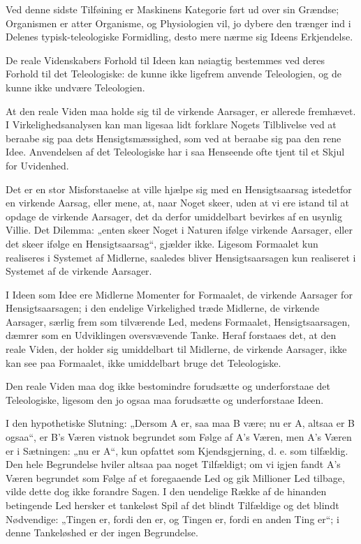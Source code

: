 \documentclass[12pt]{book}
\newcommand{\opage}[1]{\marginnote{\footnotesize\textit{[#1]}}}
\begin{document}
Ved denne sidste Tilføining er Maskinens Kategorie ført ud over sin Grændse; Organismen er atter
Organisme, og Physiologien vil, jo dybere den trænger ind i Delenes typisk-teleologiske Formidling,
desto mere nærme sig Ideens Erkjendelse.

De reale Videnskabers Forhold til Ideen kan nøiagtig bestemmes ved deres Forhold til det Teleologiske:
de kunne ikke ligefrem anvende Teleologien, og de kunne ikke undvære Teleologien.

At den reale Viden maa holde sig til de virkende Aarsager, er allerede fremhævet. I
Virkelighedsanalysen kan man ligesaa lidt forklare Nogets Tilblivelse ved at beraabe sig paa dets
Hensigtsmæssighed, som ved at beraabe sig paa den rene Idee. Anvendelsen af det Teleologiske har i saa
Henseende ofte tjent til et Skjul for Uvidenhed.

Det er en stor Misforstaaelse at ville hjælpe sig med en Hensigtsaarsag istedetfor en virkende Aarsag,
eller mene, at, naar Noget skeer, uden at vi ere istand til at opdage de virkende Aarsager, det da
derfor umiddelbart bevirkes af en usynlig Villie. Det Dilemma: „enten skeer Noget i Naturen ifølge
virkende Aarsager, eller det skeer ifølge en Hensigtsaarsag“, gjælder ikke. Ligesom Formaalet kun
realiseres i Systemet af Midlerne, saaledes bliver Hensigtsaarsagen kun realiseret i Systemet af de
virkende Aarsager.

I Ideen som Idee ere Midlerne Momenter for Formaalet, de virkende Aarsager for Hensigtsaarsagen; i den
endelige Virkelighed træde Midlerne, de virkende Aarsager, særlig frem som tilværende Led, medens
Formaalet, Hensigtsaarsagen, dæmrer som en Udviklingen oversvævende Tanke.
\opage{189} Heraf forstaaes det, at den reale Viden, der holder sig umiddelbart til Midlerne, de virkende
Aarsager, ikke kan see paa Formaalet, ikke umiddelbart bruge det Teleologiske.

Den reale Viden maa dog ikke bestomindre forudsætte og underforstaae det Teleologiske, ligesom den jo
ogsaa maa forudsætte og underforstaae Ideen.

I den hypothetiske Slutning: „Dersom A er, saa maa B være; nu er A, altsaa er B ogsaa“, er B's Væren
vistnok begrundet som Følge af A's Væren, men A's Væren er i Sætningen: „nu er A“, kun opfattet som
Kjendsgjerning, d. e. som tilfældig. Den hele Begrundelse hviler altsaa paa noget Tilfældigt; om vi
igjen fandt A's Væren begrundet som Følge af et foregaaende Led og gik Millioner Led tilbage, vilde
dette dog ikke forandre Sagen. I den uendelige Række af de hinanden betingende Led hersker et
tankeløst Spil af det blindt Tilfældige og det blindt Nødvendige: „Tingen er,
fordi den er, og Tingen er,
fordi en anden Ting er“; i denne Tankeløshed er der ingen Begrundelse.
\end{document}
